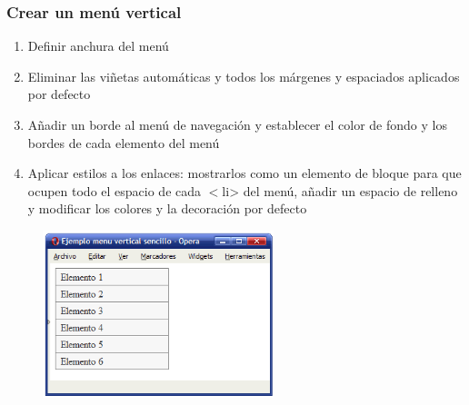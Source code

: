 \documentclass[ucs]{beamer}
\begin{document}

\begin{frame}
\frametitle{Crear un menú vertical}

\begin{enumerate}
  \item Definir anchura del menú
  \item Eliminar las viñetas automáticas y todos los márgenes y espaciados aplicados por defecto
  \item Añadir un borde al menú de navegación y establecer el color de fondo y los bordes de cada elemento del menú
  \item Aplicar estilos a los enlaces: mostrarlos como un elemento de bloque para que ocupen todo el espacio de cada $<$li> del menú, añadir un espacio de relleno y modificar los colores y la decoración por defecto
\end{enumerate}


\begin{center}
\begin{figure}[p]
\includegraphics[width=0.6\textwidth]{figs/f0908.png}
\end{figure}
\end{center}

\end{frame}


\end{document}
